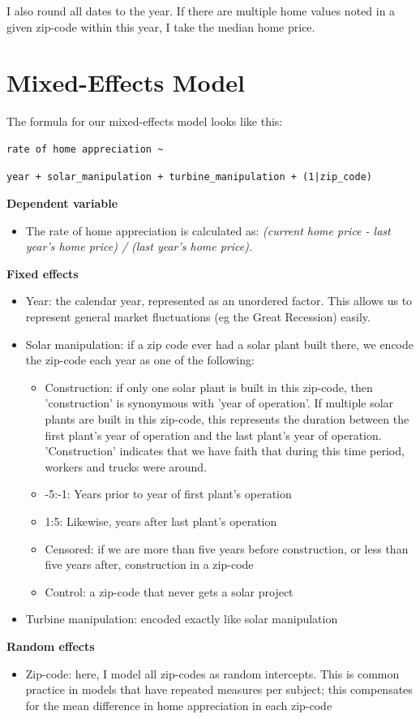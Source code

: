 \documentclass{article}
\begin{document}
I also round all dates to the year.
If there are multiple home values noted in a given zip-code within this year, I take the median home price.

\section{Mixed-Effects Model}

The formula for our mixed-effects model looks like this:
\begin{verbatim}
rate of home appreciation ~ 
\end{verbatim}
\begin{verbatim}
year + solar_manipulation + turbine_manipulation + (1|zip_code)
\end{verbatim}

\textbf{Dependent variable}
\begin{itemize}
\item The rate of home appreciation is calculated as: \emph{(current home price - last year's home price) / (last year's home price).}
\end{itemize}

\textbf{Fixed effects}
\begin{itemize}
\item Year: the calendar year, represented as an unordered factor. This allows us to represent general market fluctuations (eg the Great Recession) easily.
\item Solar manipulation: if a zip code ever had a solar plant built there, we encode the zip-code each year as one of the following:
	\begin{itemize}
	\item Construction: if only one solar plant is built in this zip-code, then 'construction' is synonymous with 'year of operation'. If multiple solar plants are built in this zip-code, this represents the duration between the first plant's year of operation and the last plant's year of operation. 'Construction' indicates that we have faith that during this time period, workers and trucks were around.
	\item -5:-1: Years prior to year of first plant's operation
	\item 1:5: Likewise, years after last plant's operation
	\item Censored: if we are more than five years before construction, or less than five years after, construction in a zip-code
	\item Control: a zip-code that never gets a solar project
	\end{itemize}
\item Turbine manipulation: encoded exactly like solar manipulation
\end{itemize}
\textbf{Random effects}
\begin{itemize}
\item Zip-code: here, I model all zip-codes as random intercepts. This is common practice in models that have repeated measures per subject; this compensates for the mean difference in home appreciation in each zip-code
\end{itemize}
\end{document}
